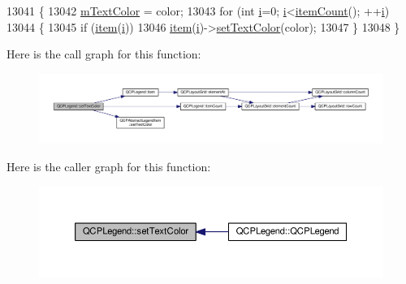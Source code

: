 \begin{DoxyCode}
13041 \{
13042   \hyperlink{class_q_c_p_legend_a478b2d809a7390e9ff8f8bb70d6bd9fe}{mTextColor} = color;
13043   \textcolor{keywordflow}{for} (\textcolor{keywordtype}{int} \hyperlink{_comparision_pictures_2_createtest_image_8m_a6f6ccfcf58b31cb6412107d9d5281426}{i}=0; \hyperlink{_comparision_pictures_2_createtest_image_8m_a6f6ccfcf58b31cb6412107d9d5281426}{i}<\hyperlink{class_q_c_p_legend_a198228e9cdc78d3a3c306fa6763d0404}{itemCount}(); ++\hyperlink{_comparision_pictures_2_createtest_image_8m_a6f6ccfcf58b31cb6412107d9d5281426}{i})
13044   \{
13045     \textcolor{keywordflow}{if} (\hyperlink{class_q_c_p_legend_a454272d7094437beb3278a2294006da5}{item}(\hyperlink{_comparision_pictures_2_createtest_image_8m_a6f6ccfcf58b31cb6412107d9d5281426}{i}))
13046       \hyperlink{class_q_c_p_legend_a454272d7094437beb3278a2294006da5}{item}(\hyperlink{_comparision_pictures_2_createtest_image_8m_a6f6ccfcf58b31cb6412107d9d5281426}{i})->\hyperlink{class_q_c_p_abstract_legend_item_a6ebace6aaffaedcdab2d74e88acc2d1e}{setTextColor}(color);
13047   \}
13048 \}
\end{DoxyCode}


Here is the call graph for this function\+:\nopagebreak
\begin{figure}[H]
\begin{center}
\leavevmode
\includegraphics[width=350pt]{class_q_c_p_legend_ae1eb239ff4a4632fe1b6c3e668d845c6_cgraph}
\end{center}
\end{figure}




Here is the caller graph for this function\+:\nopagebreak
\begin{figure}[H]
\begin{center}
\leavevmode
\includegraphics[width=350pt]{class_q_c_p_legend_ae1eb239ff4a4632fe1b6c3e668d845c6_icgraph}
\end{center}
\end{figure}


